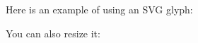 \documentclass{article}
\newcommand{\mySvgGlyph}[1][]{%
}
\begin{document}
Here is an example of using an SVG glyph: \mySvgGlyph[width=0.5cm]

You can also resize it: \mySvgGlyph[width=1cm]
\end{document}
